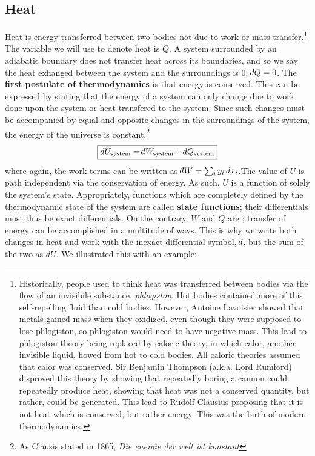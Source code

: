 \documentclass[12pt]{article}
\def\dbar{{\mathchar'26\mkern-12mu d}}
\begin{document}
\subsection{Heat}
Heat is energy transferred between two bodies not due to work or mass transfer.\footnote{Historically, people used to think heat was transferred between bodies via the flow of an invisibile substance, \textit{phlogiston}. Hot bodies contained more of this self-repelling fluid than cold bodies. However, Antoine Lavoisier showed that metals gained mass when they oxidized, even though they were supposed to lose phlogiston, so phlogiston would need to have negative mass. This lead to phlogiston theory being replaced by caloric theory, in which calor, another invisible liquid, flowed from hot to cold bodies. All caloric theories assumed that calor was conserved. Sir Benjamin Thompson (a.k.a. Lord Rumford) disproved this theory by showing that repeatedly boring a cannon could repeatedly produce heat, showing that heat was not a conserved quantity, but rather, could be generated. This lead to Rudolf Clausius proposing that it is not heat which is conserved, but rather energy. This was the birth of modern thermodynamics.} The variable we will use to denote heat is $Q$.  A system surrounded by an adiabatic boundary does not transfer heat across its boundaries, and so we say the heat exhanged between the system and the surroundings is 0; $\dbar Q = 0$.  The \textbf{first postulate of thermodynamics} is that energy is conserved. This can be expressed by stating that the energy of a system can only change due to work done upon the system or heat transfered to the system. Since such changes must be accompanied by equal and opposite changes in the surroundings of the system, the energy of the universe is constant.\footnote{As Clausis stated in 1865, \textit{Die energie der welt ist konstant}}
\begin{equation}\boxed{
dU_{\text{system}} = \dbar W_{\text{system}} + \dbar Q_{\text{system}}
}\end{equation}
where again, the work terms can be written as $\dbar W = \sum_i y_i \, dx_i$.The value of $U$ is path independent via the conservation of energy. As such, $U$ is a function of solely the system's state. Appropriately, functions which are completely defined by the thermodynamic state of the system are called \textbf{state functions}; their differentials must thus be exact differentials. On the contrary, $W$ and $Q$ are ; transfer of energy can be accomplished in a multitude of ways.  This is why we write both changes in heat and work with the inexact differential symbol, $\dbar$, but the sum of the two as $dU$. We illustrated this with an example:
\end{document}
